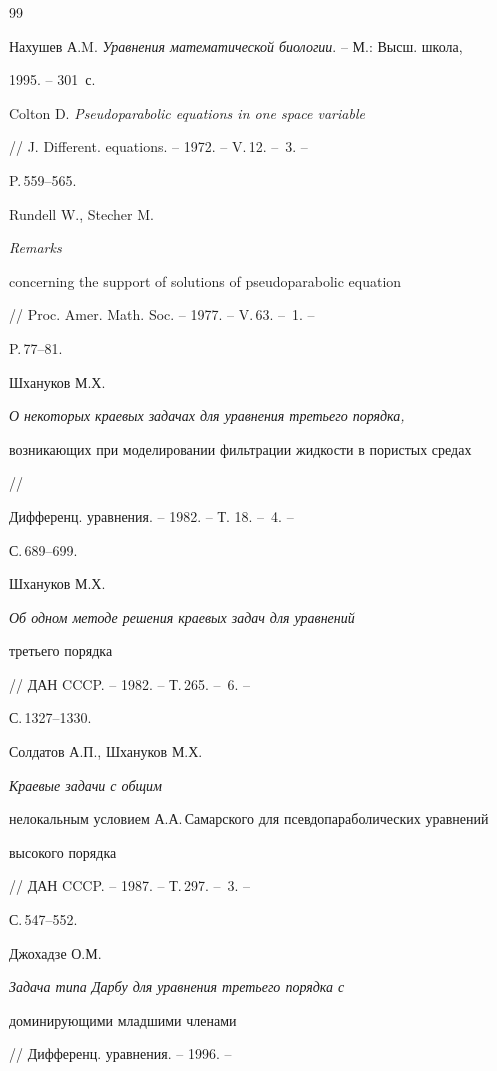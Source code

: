 \begin{thebibliography}{99}







Нахушев А.M. {\em Уравнения математической биологии}. -- М.: Высш. школа,


1995. -- 301~с.




Colton D. {\em Pseudoparabolic equations in one space variable}


// J. Different. equations. -- 1972. -- V.\,12. -- \No\,3. --


P.\,559--565.




Rundell W., Stecher M. {\em Remarks 


concerning the support of solutions of pseudoparabolic equation}


// Proc. Amer. Math. Soc. -- 1977. -- V.\,63. -- \No\,1. --


P.\,77--81.




Шхануков М.Х. {\em О некоторых краевых задачах для уравнения третьего порядка,


возникающих при моделировании фильтрации жидкости в пористых средах} //


Дифференц. уравнения. -- 1982. -- Т. 18. -- \No\,4. --


С.\,689--699.




Шхануков М.Х. {\em Об одном методе решения краевых задач для уравнений


третьего порядка} // ДАН CCCP. -- 1982. -- Т.\,265. -- \No\,6. --


С.\,1327--1330.




Солдатов А.П., Шхануков М.Х. {\em Краевые задачи с общим


нелокальным условием А.А.\,Самарского для псевдопараболических уравнений


высокого порядка} // ДАН CCCP. -- 1987. -- Т.\,297. -- \No\,3. --


С.\,547--552.




Джохадзе О.М. {\em Задача типа Дарбу для уравнения третьего порядка с


доминирующими младшими членами} // Дифференц. уравнения. -- 1996. --



\end{thebibliography}

